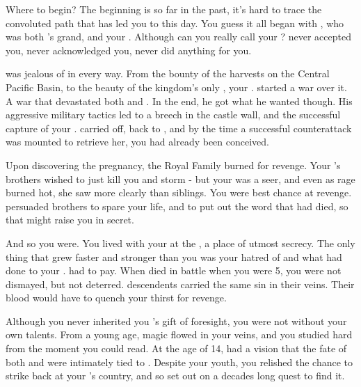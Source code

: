 \documentclass[char]{NeptuneBall}
\begin{document}
\name{\cManta{}}



Where to begin? The beginning is so far in the past, it's hard to trace the convoluted path that has led you to this day. You guess it all began with \cExExKing{\King} \cExExKing{}, who was both \cKing{\King} \cKing{}'s grand\cExExKing{\parent}, and your \cExExKing{\parent}. Although can you really call \cExExKing{\them} your \cExExKing{\parent}? \cExExKing{\They} never accepted you, never acknowledged you, never did anything for you.

\cExExKing{\They} was jealous of \pPacifica{} in every way. From the bounty of the harvests on the Central Pacific Basin, to the beauty of the kingdom's only \cMother{\prince}, your \cMother{\parent} \cMother{\MYname}. \cExExKing{} started a war over it. A war that devastated both \pPacifica{} and \pAtlantis{}. In the end, he got what he wanted though. His aggressive military tactics led to a breech in the castle wall, and the successful capture of your \cMother{\parent}. \cExExKing{} carried \cMother{\them} off, back to \pAtlantis{}, and by the time a successful counterattack was mounted to retrieve her, you had already been conceived.

Upon discovering the pregnancy, the Royal Family burned for revenge. Your \cMother{\parent}'s brothers wished to just kill you and storm \pAtlantis{} - but your \cMother{\parent} was a seer, and even as \cMother{\their} rage burned hot, she saw more clearly than \cMother{\their} siblings. You were \cMother{\their} best chance at revenge. \cMother{\they} persuaded \cMother{\their} brothers to spare your life, and to put out the word that \cMother{\they} had died, so that \cMother{\they} might raise you in secret.

And so you were. You lived with your \cMother{\parent} at the \pAssassin{}, a place of utmost secrecy. The only thing that grew faster and stronger than you was your hatred of \pAtlantis{} and what \cExExKing{} had done to your \cMother{\parent}. \cExExKing{} had to pay. When \cExExKing{\they} died in battle when you were 5, you were not dismayed, but not deterred. \cExExKing{\Their} descendents carried the same sin in their veins. Their blood would have to quench your thirst for revenge. 

Although you never inherited you \cMother{\parent}'s gift of foresight, you were not without your own talents. From a young age, magic flowed in your veins, and you studied hard from the moment you could read. At the age of 14, \cMother{} had a vision that the fate of both \pPacifica{} and \pAtlantis{} were intimately tied to \iTrident{\MYname}. Despite your youth, you relished the chance to strike back at your \cExExKing{\parent}'s country, and so set out on a decades long quest to find it.
\end{document}
